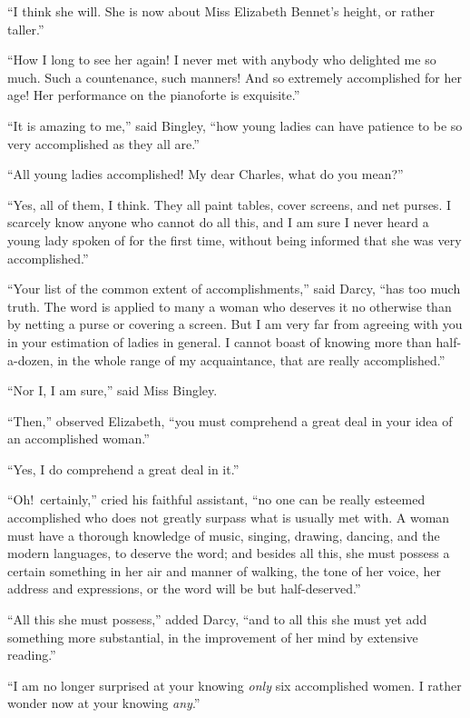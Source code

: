 \documentclass[12pt,english,oneside]{book}
\begin{document}
{}``I think she will. She is now about Miss Elizabeth Bennet's height,
or rather taller.''

{}``How I long to see her again! I never met with anybody who delighted
me so much. Such a countenance, such manners! And so extremely accomplished
for her age! Her performance on the pianoforte is exquisite.''

{}``It is amazing to me,'' said Bingley, {}``how young ladies can
have patience to be so very accomplished as they all are.''

{}``All young ladies accomplished! My dear Charles, what do you mean?''\ 

{}``Yes, all of them, I think. They all paint tables, cover screens,
and net purses. I scarcely know anyone who cannot do all this, and
I am sure I never heard a young lady spoken of for the first time,
without being informed that she was very accomplished.''

{}``Your list of the common extent of accomplishments,'' said Darcy,
{}``has too much truth. The word is applied to many a woman who deserves
it no otherwise than by netting a purse or covering a screen. But
I am very far from agreeing with you in your estimation of ladies
in general. I cannot boast of knowing more than half-a-dozen, in the
whole range of my acquaintance, that are really accomplished.''

{}``Nor I, I am sure,'' said Miss Bingley.

{}``Then,'' observed Elizabeth, {}``you must comprehend a great
deal in your idea of an accomplished woman.''

{}``Yes, I do comprehend a great deal in it.''

{}``Oh!\ certainly,'' cried his faithful assistant, {}``no one
can be really esteemed accomplished who does not greatly surpass what
is usually met with. A woman must have a thorough knowledge of music,
singing, drawing, dancing, and the modern languages, to deserve the
word; and besides all this, she must possess a certain something in
her air and manner of walking, the tone of her voice, her address
and expressions, or the word will be but half-deserved.''

{}``All this she must possess,'' added Darcy, {}``and to all this
she must yet add something more substantial, in the improvement of
her mind by extensive reading.''

{}``I am no longer surprised at your knowing \textit{only} six accomplished
women. I rather wonder now at your knowing \textit{any}.''
\end{document}
